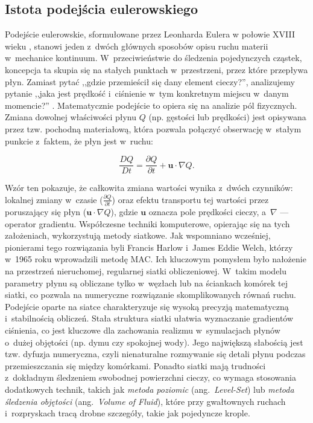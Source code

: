 \subsection{Istota podejścia eulerowskiego}
Podejście eulerowskie, sformułowane przez Leonharda Eulera w połowie XVIII wieku \cite{euler1757principes, euler1761principia}, 
stanowi jeden z~dwóch głównych sposobów opisu ruchu materii w~mechanice kontinuum. W~przeciwieństwie 
do śledzenia pojedynczych cząstek, koncepcja ta skupia się na stałych punktach w~przestrzeni, przez 
które przepływa płyn. Zamiast pytać ,,gdzie przemieścił się dany element cieczy?'', analizujemy pytanie 
,,jaka jest prędkość i~ciśnienie w~tym konkretnym miejscu w~danym momencie?'' \cite{braley2010fluid}. 
Matematycznie podejście to opiera się na analizie pól fizycznych. Zmiana dowolnej właściwości płynu 
$Q$ (np. gęstości lub prędkości) jest opisywana przez tzw. pochodną materiałową, która pozwala połączyć 
obserwację w~stałym punkcie z~faktem, że płyn jest w~ruchu:

\begin{equation}
\frac{DQ}{Dt} = \frac{\partial Q}{\partial t} + \mathbf{u} \cdot \nabla Q.
\end{equation}

Wzór ten pokazuje, że całkowita zmiana wartości wynika z~dwóch czynników: lokalnej zmiany w~czasie ($\frac{\partial Q}{\partial t}$)
oraz efektu transportu tej wartości przez poruszający się płyn ($\mathbf{u} \cdot \nabla Q$), gdzie $\mathbf{u}$ oznacza pole prędkości cieczy, a~$\nabla$ --- operator gradientu.
Współczesne techniki komputerowe, opierając się na tych założeniach, wykorzystują metody siatkowe. 
Jak wspomniano wcześniej, pionierami tego rozwiązania byli Francis Harlow i~James Eddie Welch, 
którzy w~1965 roku wprowadzili metodę MAC\cite{harlow1965numerical}. Ich kluczowym pomysłem było 
nałożenie na przestrzeń nieruchomej, regularnej siatki obliczeniowej. W~takim modelu parametry płynu są 
obliczane tylko w~węzłach lub na ściankach komórek tej siatki, co pozwala na numeryczne rozwiązanie skomplikowanych 
równań ruchu. Podejście oparte na siatce charakteryzuje się wysoką precyzją matematyczną i~stabilnością obliczeń. 
Stała struktura siatki ułatwia wyznaczanie gradientów ciśnienia, co jest kluczowe dla zachowania realizmu
w~symulacjach płynów o~dużej objętości (np. dymu czy spokojnej wody). Jego największą słabością jest tzw. 
dyfuzja numeryczna, czyli nienaturalne rozmywanie się detali płynu podczas przemieszczania się między komórkami. 
Ponadto siatki mają trudności z~dokładnym śledzeniem swobodnej powierzchni cieczy, co wymaga stosowania dodatkowych 
technik, takich jak \textit{metoda poziomic} (ang.~\textit{Level-Set}) 
lub \textit{metoda śledzenia objętości} (ang.~\textit{Volume of Fluid}), które przy gwałtownych ruchach
i~rozpryskach tracą drobne szczegóły, takie jak pojedyncze krople.

